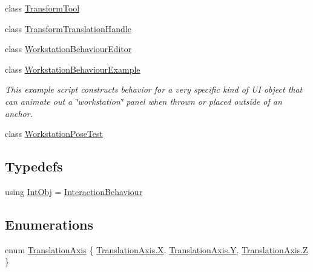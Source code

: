 \begin{DoxyCompactItemize}
\item 
class \mbox{\hyperlink{class_leap_1_1_unity_1_1_examples_1_1_transform_tool}{Transform\+Tool}}
\item 
class \mbox{\hyperlink{class_leap_1_1_unity_1_1_examples_1_1_transform_translation_handle}{Transform\+Translation\+Handle}}
\item 
class \mbox{\hyperlink{class_leap_1_1_unity_1_1_examples_1_1_workstation_behaviour_editor}{Workstation\+Behaviour\+Editor}}
\item 
class \mbox{\hyperlink{class_leap_1_1_unity_1_1_examples_1_1_workstation_behaviour_example}{Workstation\+Behaviour\+Example}}
\begin{DoxyCompactList}\small\item\em This example script constructs behavior for a very specific kind of UI object that can animate out a \char`\"{}workstation\char`\"{} panel when thrown or placed outside of an anchor. \end{DoxyCompactList}\item 
class \mbox{\hyperlink{class_leap_1_1_unity_1_1_examples_1_1_workstation_pose_test}{Workstation\+Pose\+Test}}
\end{DoxyCompactItemize}
\subsection*{Typedefs}
\begin{DoxyCompactItemize}
\item 
using \mbox{\hyperlink{namespace_leap_1_1_unity_1_1_examples_a009a8c553109ae98a972c43c460d0041}{Int\+Obj}} = \mbox{\hyperlink{class_leap_1_1_unity_1_1_interaction_1_1_interaction_behaviour}{Interaction\+Behaviour}}
\end{DoxyCompactItemize}
\subsection*{Enumerations}
\begin{DoxyCompactItemize}
\item 
enum \mbox{\hyperlink{namespace_leap_1_1_unity_1_1_examples_a76ed01cc0aaa8ede4fc75e38919a60a5}{Translation\+Axis}} \{ \mbox{\hyperlink{namespace_leap_1_1_unity_1_1_examples_a76ed01cc0aaa8ede4fc75e38919a60a5a02129bb861061d1a052c592e2dc6b383}{Translation\+Axis.\+X}}, 
\mbox{\hyperlink{namespace_leap_1_1_unity_1_1_examples_a76ed01cc0aaa8ede4fc75e38919a60a5a57cec4137b614c87cb4e24a3d003a3e0}{Translation\+Axis.\+Y}}, 
\mbox{\hyperlink{namespace_leap_1_1_unity_1_1_examples_a76ed01cc0aaa8ede4fc75e38919a60a5a21c2e59531c8710156d34a3c30ac81d5}{Translation\+Axis.\+Z}}
 \}
\end{DoxyCompactItemize}


